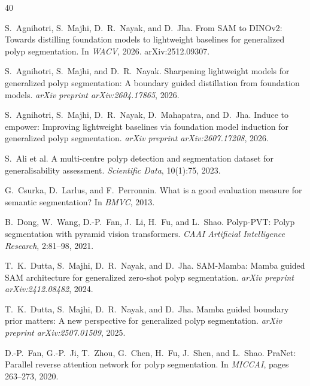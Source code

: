 \documentclass[10pt,twocolumn]{article}
\begin{document}
\begin{thebibliography}{40}

S.~Agnihotri, S.~Majhi, D.~R.~Nayak, and D.~Jha.
\newblock From SAM to DINOv2: Towards distilling foundation models to lightweight baselines for generalized polyp segmentation.
\newblock In \emph{WACV}, 2026. arXiv:2512.09307.

S.~Agnihotri, S.~Majhi, and D.~R.~Nayak.
\newblock Sharpening lightweight models for generalized polyp segmentation: A boundary guided distillation from foundation models.
\newblock \emph{arXiv preprint arXiv:2604.17865}, 2026.

S.~Agnihotri, S.~Majhi, D.~R.~Nayak, D.~Mahapatra, and D.~Jha.
\newblock Induce to empower: Improving lightweight baselines via foundation model induction for generalized polyp segmentation.
\newblock \emph{arXiv preprint arXiv:2607.17208}, 2026.

S.~Ali et al.
\newblock A multi-centre polyp detection and segmentation dataset for generalisability assessment.
\newblock \emph{Scientific Data}, 10(1):75, 2023.

G.~Csurka, D.~Larlus, and F.~Perronnin.
\newblock What is a good evaluation measure for semantic segmentation?
\newblock In \emph{BMVC}, 2013.

B.~Dong, W.~Wang, D.-P.~Fan, J.~Li, H.~Fu, and L.~Shao.
\newblock Polyp-PVT: Polyp segmentation with pyramid vision transformers.
\newblock \emph{CAAI Artificial Intelligence Research}, 2:81--98, 2021.

T.~K.~Dutta, S.~Majhi, D.~R.~Nayak, and D.~Jha.
\newblock SAM-Mamba: Mamba guided SAM architecture for generalized zero-shot polyp segmentation.
\newblock \emph{arXiv preprint arXiv:2412.08482}, 2024.

T.~K.~Dutta, S.~Majhi, D.~R.~Nayak, and D.~Jha.
\newblock Mamba guided boundary prior matters: A new perspective for generalized polyp segmentation.
\newblock \emph{arXiv preprint arXiv:2507.01509}, 2025.

D.-P.~Fan, G.-P.~Ji, T.~Zhou, G.~Chen, H.~Fu, J.~Shen, and L.~Shao.
\newblock PraNet: Parallel reverse attention network for polyp segmentation.
\newblock In \emph{MICCAI}, pages 263--273, 2020.


\end{thebibliography}
\end{document}

